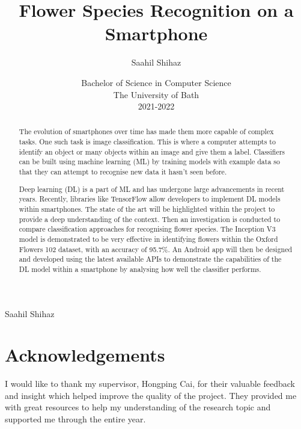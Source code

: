 \documentclass[12pt,a4paper]{report}
\title{\bf Flower Species Recognition on a Smartphone}
\author{Saahil Shihaz}
\date{Bachelor of Science in Computer Science\\
    The University of Bath\\
    2021-2022}
\begin{document}
\hypersetup{pageanchor=false}
\setcounter{page}{0}
\maketitle
\newpage
{}
\newpage
{}
{Saahil Shihaz}
\newpage
\hypersetup{pageanchor=true}
\begin{abstract}

    The evolution of smartphones over time has made them more capable of complex tasks. One such task is image 
    classification. This is where a computer attempts to identify an object or many objects within an image and give 
    them a label. Classifiers can be built using machine learning (ML) by training models with example data so that they 
    can attempt to recognise new data it hasn't seen before. 
    
    \par
    
    Deep learning (DL) is a part of ML and has undergone large advancements in
    recent years. Recently, libraries like TensorFlow allow developers to implement DL models within 
    smartphones. The state of the art will be highlighted within the project to provide a deep understanding of the 
    context. Then an investigation is conducted to compare classification approaches for recognising flower species. The
    Inception V3 model is demonstrated to be very effective in identifying flowers within the Oxford Flowers 102 
    dataset, with an accuracy of 95.7\%. An Android app will then be designed and developed using the latest available 
    APIs to demonstrate the capabilities of the DL model within a smartphone by analysing how well the classifier 
    performs. 

\end{abstract}
\clearpage
\tableofcontents
\clearpage
\listoffigures
\listoftables
\clearpage
\chapter*{Acknowledgements}

I would like to thank my supervisor, Hongping Cai, for their valuable feedback and insight which helped improve the 
quality of the project. They provided me with great resources to help my understanding of the research topic and
supported me through the entire year.

\par
\end{document}
